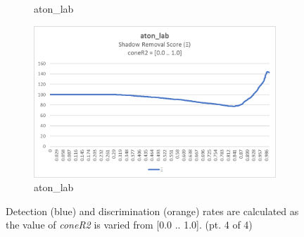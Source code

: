 \begin{appendices}
\begin{figure}
\begin{subfigure}{.45\linewidth}
  \caption{aton\_lab}
\end{subfigure}
\hfill
\begin{subfigure}{.45\linewidth}
  \includegraphics[width=1\linewidth]{figures/appendix/lab_coneR2_score.jpg}
  \caption{aton\_lab}
\end{subfigure}

\caption{Detection (blue) and discrimination (orange) rates are calculated as the value of \textit{coneR2} is varied from [0.0 .. 1.0]. (pt. 4 of 4)}
\end{figure}


\end{appendices}
